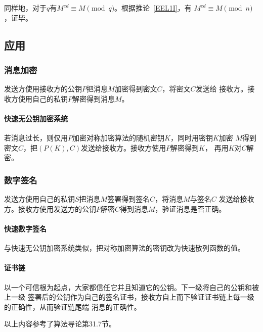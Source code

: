 同样地，对于$q$有$M^{ed}\equiv M \pmod{q}$。根据推论~\ref{EEL1I}，有
$M^{ed}\equiv M \pmod{n}$，证毕。

\subsection{应用}
\subsubsection{消息加密}
发送方使用接收方的公钥$P$把消息$M$加密得到密文$C$，将密文$C$发送给
接收方。接收方使用自己的私钥$P$解密得到消息$M$。
\paragraph{快速无公钥加密系统}
若消息过长，则仅用$P$加密对称加密算法的随机密钥$K$，同时用密钥$K$加密
$M$得到密文$C$，把$(P(K),C)$发送给接收方。接收方使用$P$解密得到$K$，
再用$K$对$C$解密。
\subsubsection{数字签名}
发送方使用自己的私钥$S$把消息$M$签署得到签名$C$，将消息$M$与签名$C$
发送给接收方。接收方使用发送方的公钥$P$解密$C$得到消息$M$，验证消息是否正确。
\paragraph{快速数字签名}
与快速无公钥加密系统类似，把对称加密算法的密钥改为快速散列函数的值。
\paragraph{证书链}
以一个可信根为起点，大家都信任它并且知道它的公钥。下一级将自己的公钥和被上一级
签署后的公钥作为自己的签名证书，接收方自上而下验证证书链上每一级的正确性，从而验证链尾端
消息的正确性。

以上内容参考了算法导论\cite{ITA3}第31.7节。
